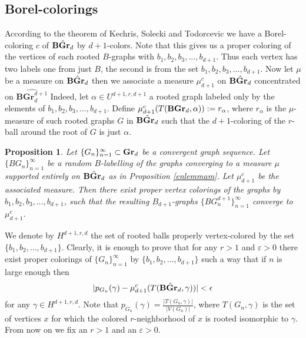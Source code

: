 \documentclass{article}
\newtheorem{propo}{Proposition}[section]
\newcommand{\ep}{\varepsilon}
\newcommand{\e}{\ep}
\newcommand{\Grd}[1][d]{\textrm{\textbf{Gr}}_{#1}}
\newcommand{\BGrd}[1][d]{\textrm{\textbf{BGr}}_{#1}}
\newcommand{\hb}{\hat{\BGrd}}
\def\proof{\smallskip\noindent{\it Proof.} }
\begin{document}
\subsection{Borel-colorings}
According to the theorem of Kechris, Solecki and Todorcevic \cite{KST}
we have a Borel-coloring $c$ of
$\hb$ by $d+1$-colors. Note that this gives us a proper
coloring of the vertices of each rooted $B$-graphs with 
$b_1,b_2,b_3,\dots,b_{d+1}$. Thus each vertex has two labels
one from just $B$, the second is from the set
$b_1,b_2,b_3,\dots,b_{d+1}$.
Now let $\mu$ be a  measure on
$\hb$ then we associate a measure $\mu^c_{d+1}$ on 
$\hb$ concentrated on $\hat{\textbf{BGr}^{d+1}_d}$
Indeed, let $\alpha\in U^{d+1,r,d+1}$ a rooted graph labeled only
by the elements of $b_1,b_2,b_3,\dots,b_{d+1}$. Define
$\mu^c_{d+1}(T(\BGrd,\alpha)):=r_{\alpha}$, where
$r_{\alpha}$ is the $\mu$-measure of such rooted graphs $G$ in $\hb$
such that the $d+1$-coloring of the $r$-ball around the root of $G$
is just $\alpha$. 
\begin{propo}
Let $\{G_n\}^\infty_{n=1}\subset\Grd$ be a convergent graph sequence. Let
$\{BG_n\}^\infty_{n=1}$ be a random $B$-labelling of the graphs converging
to a measure $\mu$ supported entirely on $\hb$ as in
Proposition \ref{enlemmam}. Let $\mu^c_{d+1}$ be the associated
measure. Then there exist  proper vertex colorings of the graphs
by $b_1,b_2,b_3,\dots,b_{d+1}$, such that the resulting $B_{d+1}$-graphs
$\{BG_n^{d+1}\}^\infty_{n=1}$ converge to $\mu^c_{d+1}$.
\end{propo}

\proof
We denote by $H^{d+1,r,d}$ the set of rooted balls properly vertex-colored
by the set $\{b_1, b_2,\dots, b_{d+1}\}$.
Clearly, it is enough to prove that for any $r>1$ and $\e>0$ there exist
proper colorings of $\{G_n\}^\infty_{n=1}$ by $\{b_1, b_2,\dots, b_{d+1}\}$
such a way that if $n$ is large enough then
\begin{equation}
\label{celformula}
|p_{G_n}(\gamma)-\mu^c_{d+1}(T(\hb,\gamma))|<\epsilon
\end{equation}
for any $\gamma\in H^{d+1,r,d}$.
Note that $p_{G_n}(\gamma)=\frac{|T(G_n,\gamma)|}{|V(G_n)|}$, where
$T(G_n,\gamma)$ is the set of vertices $x$ for which the colored
$r$-neighborhood of $x$ is rooted isomorphic to $\gamma$.
From now on we fix an $r>1$ and an $\e>0$.
\end{document}
